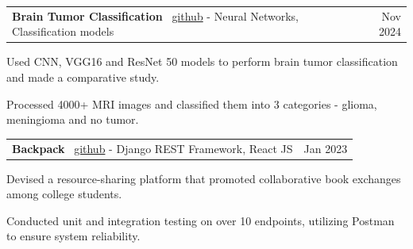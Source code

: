 \documentclass[a4paper,20pt]{article}
\makeatletter
\newcommand{\resumeSmallSubheading}[2]{
  \vspace{-1pt}\item
    \begin{tabular*}{0.97\textwidth}{l@{\extracolsep{\fill}}r}
      #1 & #2 \\
    \end{tabular*}\vspace{-5pt}
}
\makeatother
\begin{document}
    \vspace{-2pt}

    \resumeSmallSubheading{\textbf{Brain Tumor Classification} \textbar ~\href{https://github.com/satyamrs00/brain-tumor-classification/}{github} - Neural Networks, Classification models}{Nov 2024} %
    
    \begin{description}[font=$\bullet$]
        \item {Used CNN, VGG16 and ResNet 50 models to perform brain tumor classification and made a comparative study.}
    \vspace{-2pt}
        \item {Processed 4000+ MRI images and classified them into 3 categories - glioma, meningioma and no tumor.}
    \vspace{-2pt}
    \end{description}
    \vspace{-2pt}


    \resumeSmallSubheading{\textbf{Backpack} \textbar ~\href{https://github.com/satyamrs00/backpack/}{github} - Django REST Framework, React JS}{Jan 2023} %
        
    \begin{description}[font=$\bullet$]
        \item {Devised a resource-sharing platform that promoted collaborative book exchanges among college students.}
    \vspace{-2pt}
        \item {Conducted unit and integration testing on over 10 endpoints, utilizing Postman to ensure system reliability.}
    \end{description}

    
\end{document}
